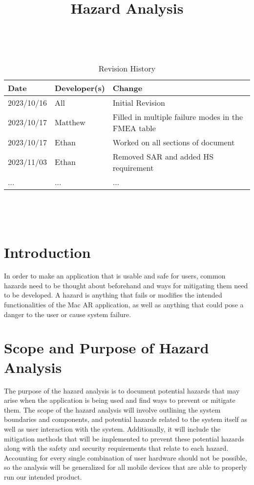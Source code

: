 \documentclass{article}
\title{Hazard Analysis\\\progname}
\author{\authname}
\date{}
\begin{document}
\maketitle
\thispagestyle{empty}

~\newpage


\begin{table}[hp]
\caption{Revision History} \label{TblRevisionHistory}
\begin{tabularx}{\textwidth}{llX}
\toprule
\textbf{Date} & \textbf{Developer(s)} & \textbf{Change}\\
\midrule
2023/10/16 & All & Initial Revision\\
2023/10/17 & Matthew & Filled in multiple failure modes in the FMEA table \\
2023/10/17 & Ethan & Worked on all sections of document \\
2023/11/03 & Ethan & Removed SAR and added HS requirement \\
... & ... & ...\\
\bottomrule
\end{tabularx}
\end{table}

~\newpage

\tableofcontents

~\newpage



\section{Introduction}


In order to make an application that is usable and safe for users, common hazards need to be thought about beforehand and ways for mitigating them need to be developed. A hazard is anything that fails or modifies the intended functionalities of the Mac AR application, as well as anything that could pose a danger to the user or cause system failure.

\section{Scope and Purpose of Hazard Analysis}
The purpose of the hazard analysis is to document potential hazards that may arise when the application is being used and find ways to prevent or mitigate them. The scope of the hazard analysis will involve outlining the system boundaries and components, and potential hazards related to the system itself as well as user interaction with the system. Additionally, it will include the mitigation methods that will be implemented to prevent these potential hazards along with the safety and security requirements that relate to each hazard. Accounting for every single combination of user hardware should not be possible, so the analysis will be generalized for all mobile devices that are able to properly run our intended product.
\end{document}
